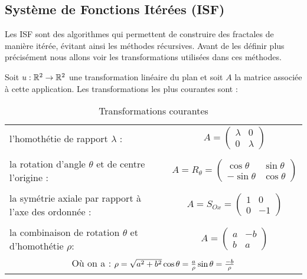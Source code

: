 
	\subsection{Système de Fonctions Itérées (ISF)}
		Les ISF sont des algorithmes qui permettent de construire des fractales de manière itérée, évitant ainsi les méthodes récursives. Avant de les définir plus précisément nous allons voir les transformations utilisées dans ces méthodes.

		\medskip

		Soit $u:\mathbb{R}^2\to\mathbb{R}^2$ une transformation linéaire du plan et soit $A$ la matrice associée à cette application.
		Les transformations les plus courantes sont :

		\begin{table}[H]
			\centering
			\begin{tabular}{lc}
				l'homothétie de rapport $\lambda$ :
				&	$A = \begin{pmatrix}
						\lambda & 0 		\\
						0 		& \lambda
					\end{pmatrix}$
				\\
				\\
				la rotation d'angle $\theta$ et de centre l'origine :
				&	$A = R_\theta = \begin{pmatrix}
						\cos\theta	& \sin\theta	\\
						-\sin\theta	& \cos\theta
					\end{pmatrix}$
				\\
				\\
				la symétrie axiale par rapport à l'axe des ordonnée :
				&	$A = S_{Ox} = \begin{pmatrix}
						1 & 0	\\
						0 & -1
					\end{pmatrix}$
				\\
				\\
				la combinaison de rotation $\theta$ et d'homothétie $\rho$:
				&	$A = \begin{pmatrix}
						a & -b	\\
						b & a
					\end{pmatrix}$
				\\
				\multicolumn{2}{c}{
					\smallskip
					Où on a : \hfill
					$
						\rho = \sqrt{a^2 + b^2}
							\hfill
						\cos\theta = \frac{a}{\rho}
							\hfill
						\sin\theta = \frac{-b}{\rho}
					$
				} \\		
			\end{tabular}
			\caption{Transformations courantes}
			\label{tb-2-transf}
		\end{table}


